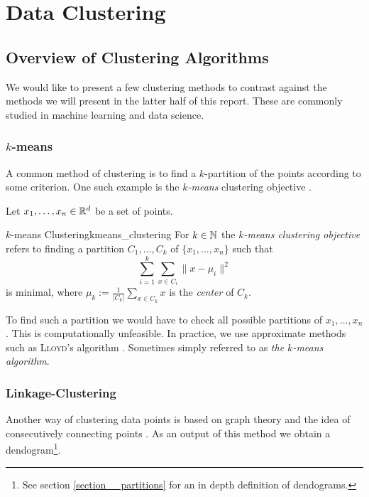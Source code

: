 \chapter{Data Clustering}
\label{chapter__dataclustering}

\section{Overview of Clustering Algorithms}
We would like to present a few clustering methods to contrast against the methods we will present in the latter half of this report. These are commonly studied in machine learning and data science.

\subsection{$k$-means}
A common method of clustering is to find a $k$-partition of the points according to some criterion.
One such example is the \emph{$k$-means} clustering objective \cite[Sec.~3.1]{Scitovski2021}.

Let $x_1, \dots, x_n \in \mathbb R^d$ be a set of points.

\begin{definition}{$k$-means Clustering}{kmeans_clustering}
For $k \in \mathbb N$ the \emph{$k$-means clustering objective} refers to finding a partition $C_1, \dots, C_k$ of $\{x_1, \dots, x_n\}$ such that
\begin{equation*}
\label{eq:kmean_optimization}
    \sum_{i = 1}^k \sum_{x \in C_i} \|x - \mu_i\|^2
\end{equation*}
is minimal, where $\mu_k := \frac{1}{|C_k|}\sum_{x \in C_k} x$ is the \emph{center} of $C_k$.
\end{definition}
To find such a partition we would have to check all possible partitions of $x_1, \dots, x_n$. This is computationally unfeasible. In practice, we use approximate methods such as \textsc{Lloyd}'s algorithm \cite[Sec.~3.1.2]{Scitovski2021}.
Sometimes simply referred to as \emph{the $k$-means algorithm}.

\subsection{Linkage-Clustering}
\label{section__linkage_clustering}
Another way of clustering data points is based on graph theory and the idea of consecutively connecting points \cite[Sec.~4.2.2]{Everitt2011}.
As an output of this method we obtain a
dendogram\footnote{See section \ref{section__partitions} for an in depth definition of dendograms.}.

